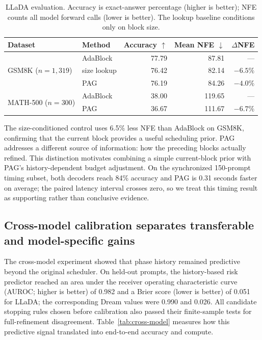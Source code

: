 \documentclass{article}
\newcommand{\pag}{PAG}
\newcommand{\nfe}{NFE}
\begin{document}
\begin{table}[t]
  \caption{LLaDA evaluation. Accuracy is exact-answer percentage (higher is better); \nfe{} counts all model forward calls (lower is better). The lookup baseline conditions only on block size.}
  \label{tab:initial-results}
  \centering
  \small
  \begin{tabular}{llrrr}
    \toprule
    Dataset & Method & Accuracy $\uparrow$ & Mean \nfe{} $\downarrow$ & $\Delta$\nfe{} \\
    \midrule
    \multirow{3}{*}{GSM8K ($n=1{,}319$)}
      & AdaBlock & 77.79 & 87.81 & --- \\
      & size lookup & 76.42 & 82.14 & $-6.5\%$ \\
      & \pag{} & 76.19 & 84.26 & $-4.0\%$ \\
    \midrule
    \multirow{2}{*}{MATH-500 ($n=300$)}
      & AdaBlock & 38.00 & 119.65 & --- \\
      & \pag{} & 36.67 & 111.67 & $-6.7\%$ \\
    \bottomrule
  \end{tabular}
\end{table}

The size-conditioned control uses 6.5\% less \nfe{} than AdaBlock on GSM8K, confirming that the current block provides a useful scheduling prior. PAG addresses a different source of information: how the preceding blocks actually refined. This distinction motivates combining a simple current-block prior with PAG's history-dependent budget adjustment. On the synchronized 150-prompt timing subset, both decoders reach 84\% accuracy and PAG is 0.31 seconds faster on average; the paired latency interval crosses zero, so we treat this timing result as supporting rather than conclusive evidence.

\subsection{Cross-model calibration separates transferable and model-specific gains}

The cross-model experiment showed that phase history remained predictive beyond the original scheduler. On held-out prompts, the history-based risk predictor reached an area under the receiver operating characteristic curve (AUROC; higher is better) of 0.982 and a Brier score (lower is better) of 0.051 for LLaDA; the corresponding Dream values were 0.990 and 0.026. All candidate stopping rules chosen before calibration also passed their finite-sample tests for full-refinement disagreement. Table~\ref{tab:cross-model} measures how this predictive signal translated into end-to-end accuracy and compute.
\end{document}
